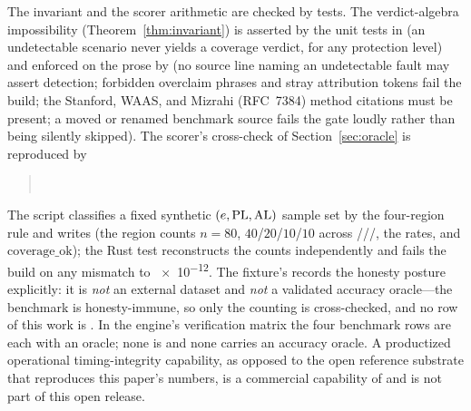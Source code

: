The \Proven{} invariant and the scorer arithmetic are checked by tests. The
verdict-algebra impossibility (Theorem~\ref{thm:invariant}) is asserted by the unit
tests in  (an undetectable scenario never yields a
coverage verdict, for any protection level) and enforced on the prose by
 (no source line naming an undetectable fault
may assert detection; forbidden overclaim phrases and stray attribution tokens
fail the build; the Stanford, WAAS, and Mizrahi (RFC~7384) method citations must be
present; a moved or renamed benchmark source fails the gate loudly rather than being
silently skipped).
The scorer's  cross-check of Section~\ref{sec:oracle} is
reproduced by
\begin{quote}
  \\
\end{quote}
The  script classifies a fixed synthetic $(e,\mathrm{PL},\mathrm{AL})$ sample set by
the four-region rule and writes  (the region
counts $n=80$, $40$/$20$/$10$/$10$ across \Nominal{}/\MI{}/\HMI{}/\Unavail{}, the
rates, and $\mathrm{coverage\_ok}$); the Rust test reconstructs the counts
independently and fails the build on any mismatch to \num{e-12}. The fixture's
 records the honesty posture explicitly: it is \emph{not} an
external dataset and \emph{not} a validated accuracy oracle---the benchmark is
honesty-immune, so only the counting is cross-checked, and no row of this work is
\Validated{}. In the engine's verification matrix the four benchmark rows are each
 with an  oracle; none is 
and none carries an  accuracy oracle. A productized
operational timing-integrity capability, as opposed to the open reference substrate
that reproduces this paper's numbers, is a commercial capability of
 and is not part of this open release.
